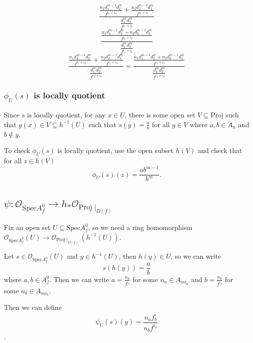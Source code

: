\documentclass[11pt]{article}
\begin{document}
    \[
\frac{\frac{n_1d_1^{m-1}d_2^m}{f^{i_1+i_2}}+\frac{n_2d_2^{m-1}d_1^m}{f^{i_1+i_2}}}{\frac{d_1^md_2^m}{f^{i_1+i_2}}}
\] \[
\frac{\frac{n_1d_1^{m-1}d_2^m+n_2d_2^{m-1}d_1^m}{f^{i_1+i_2}}}{\frac{d_1^md_2^m}{f^{i_1+i_2}}}
\] \[
\frac{\frac{n_1d_1^{m-1}d_2^m}{f^{i_1+i_2}}+\frac{n_2d_2^{m-1}d_1^m}{f^{i_1+i_2}}}{\frac{d_1^md_2^m}{f^{i_1+i_2}}}=\frac{\frac{n_1d_1^{m-1}d_2^m+n_2d_2^{m-1}d_1^m}{f^{i_1+i_2}}}{\frac{d_1^md_2^m}{f^{i_1+i_2}}}
\]

    \hypertarget{phi_us-is-locally-quotient}{%
\subsubsection{\texorpdfstring{\(\phi_U(s)\) is locally
quotient}{\textbackslash phi\_U(s) is locally quotient}}\label{phi_us-is-locally-quotient}}

Since \(s\) is locally quotient, for any \(x\in U\), there is some open
set \(V\subseteq \mathrm{Proj}\) such that
\(g(x)\in V\subseteq h^{-1}(U)\) such that \(s(y)=\frac a b\) for all
\(y\in V\) where \(a,b\in A_n\) and \(b\not\in y\).

To check \(\phi_U(s)\) is locally quotient, use the open subset \(h(V)\)
and check that for all \(z\in h(V)\) \[
\phi_U(s)(z)=\frac{ab^{m-1}}{b^m}.
\]

    \hypertarget{psimathcal-o_mathrmspeca0_fto-h_mathcal-o_mathrmprojmid_df}{%
\subsection{\texorpdfstring{\(\psi:\mathcal O_{\mathrm{Spec}A^0_f}\to h_*\mathcal O_{\mathrm{Proj}\mid_{D(f)}}\)}{\textbackslash psi:\textbackslash mathcal O\_\{\textbackslash mathrm\{Spec\}A\^{}0\_f\}\textbackslash to h\_*\textbackslash mathcal O\_\{\textbackslash mathrm\{Proj\}\textbackslash mid\_\{D(f)\}\}}}\label{psimathcal-o_mathrmspeca0_fto-h_mathcal-o_mathrmprojmid_df}}

Fix an open set \(U\subseteq\mathrm{Spec}A^0_f\), so we need a ring
homomorphism
\(\mathcal O_{\mathrm{Spec}A^0_f}(U)\to \mathcal O_{\mathrm{Proj}\mid_{D(f)}}(h^{-1}(U))\).

Let \(s\in \mathcal O_{\mathrm{Spec}A^0_f}(U)\) and \(y\in h^{-1}(U)\),
then \(h(y)\in U\), so we can write \[
s(h(y))=\frac{a}{b}
\] where \(a,b\in A^0_f\). Then we can write \(a=\frac{n_a}{f^{i_a}}\)
for some \(n_a\in A_{mi_a}\) and \(b=\frac{n_b}{f^{i_b}}\) for some
\(n_b\in A_{mi_b}\).

Then we can define \[
\psi_U(s)(y)=\frac{n_af^i_b}{n_bf^{i_a}}
\].
\end{document}
